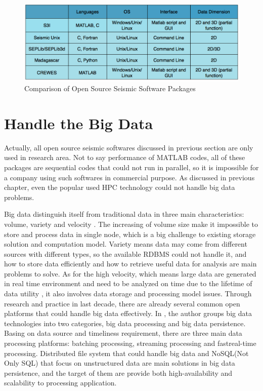 \begin{figure}[h]
\centering
\includegraphics[scale=.42]{figures/open_package_list.png}
\caption{Comparison of Open Source Seismic Software Packages \cite{CeGPS3I}}
\label{open_package_list}
\end{figure}

\section{Handle the Big Data}
Actually, all open source seismic softwares discussed in previous section are only used in research area. Not to say performance of MATLAB codes, all of these packages are sequential codes that could not run in parallel, so it is impossible for a company using such softwares in commercial purpose. As discussed in previous chapter, even the popular used HPC technology could not handle big data problems. 

Big data distinguish itself from traditional data in three main characteristics: volume, variety and velocity \cite{CharactOfBigData}. The increasing of volume size make it impossible to store and process data in single node, which is a big challenge to existing storage solution and computation model. Variety means data may come from different sources with different types, so the available RDBMS could not handle it, and how to store data efficiently and how to retrieve useful data for analysis are main problems to solve. As for the high velocity, which means large data are generated in real time environment and need to be analyzed on time due to the lifetime of data utility \cite{CharactOfBigData}, it also involves data storage and processing model issues. Through research and practice in last decade, there are already several common open platforms that could handle big data effectively. In \cite{ChallengeOfBigData}, the author groups big data technologies into two categories, big data processing and big data persistence. Basing on data source and timeliness requirement, there are three main data processing platforms: batching processing, streaming processing and fast\/real-time processing. Distributed file system that could handle big data and NoSQL(Not Only SQL) that focus on unstructured data are main solutions in big data persistence, and the target of them are provide both high-availability and scalability to processing application.  

